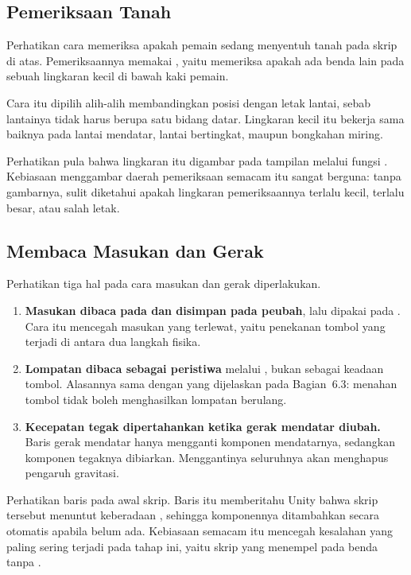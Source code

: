 \subsection{Pemeriksaan Tanah}

Perhatikan cara memeriksa apakah pemain sedang menyentuh tanah pada skrip di
atas. Pemeriksaannya memakai , yaitu memeriksa
apakah ada benda lain pada sebuah lingkaran kecil di bawah kaki pemain.

Cara itu dipilih alih-alih membandingkan posisi dengan letak lantai, sebab
lantainya tidak harus berupa satu bidang datar. Lingkaran kecil itu bekerja
sama baiknya pada lantai mendatar, lantai bertingkat, maupun bongkahan miring.

Perhatikan pula bahwa lingkaran itu digambar pada tampilan 
melalui fungsi . Kebiasaan menggambar daerah
pemeriksaan semacam itu sangat berguna: tanpa gambarnya, sulit diketahui apakah
lingkaran pemeriksaannya terlalu kecil, terlalu besar, atau salah letak.

\subsection{Membaca Masukan dan Gerak}

Perhatikan tiga hal pada cara masukan dan gerak diperlakukan.

\begin{enumerate}
  \item \textbf{Masukan dibaca pada  dan disimpan pada peubah},
        lalu dipakai pada . Cara itu mencegah masukan yang
        terlewat, yaitu penekanan tombol yang terjadi di antara dua langkah
        fisika.
  \item \textbf{Lompatan dibaca sebagai peristiwa} melalui
        , bukan sebagai keadaan tombol. Alasannya
        sama dengan yang dijelaskan pada Bagian~6.3: menahan tombol tidak boleh
        menghasilkan lompatan berulang.
  \item \textbf{Kecepatan tegak dipertahankan ketika gerak mendatar diubah.}
        Baris gerak mendatar hanya mengganti komponen
        mendatarnya, sedangkan komponen tegaknya dibiarkan. Menggantinya
        seluruhnya akan menghapus pengaruh gravitasi.
\end{enumerate}

\begin{tipsbox}
Perhatikan baris  pada awal
skrip. Baris itu memberitahu Unity bahwa skrip tersebut menuntut keberadaan
, sehingga komponennya ditambahkan secara otomatis
apabila belum ada. Kebiasaan semacam itu mencegah kesalahan yang paling sering
terjadi pada tahap ini, yaitu skrip yang menempel pada benda tanpa
.
\end{tipsbox}
